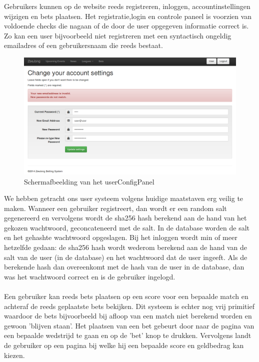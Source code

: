 \documentclass[11pt]{article}
\begin{document}
Gebruikers kunnen op de website reeds registreren, inloggen, accountinstellingen wijzigen en bets plaatsen.
Het registratie,login en controle paneel is voorzien van voldoende checks die nagaan of de door de user opgegeven informatie correct is.  Zo kan een user bijvoorbeeld niet registreren met een syntactisch ongeldig emailadres of een gebruikersnaam die reeds bestaat.
\begin{figure}[h!]
	\begin{center}
	\includegraphics[scale=0.35]{changesettings.png}

	\caption{Schermafbeelding van het userConfigPanel}
	\label{fig:configPanel}
	\end{center}
\end{figure}
We hebben getracht ons user systeem volgens huidige maatstaven erg veilig te maken.
Wanneer een gebruiker registreert, dan wordt er een random salt gegenereerd en vervolgens wordt de sha256 hash berekend aan de hand van het gekozen wachtwoord, geconcateneerd met de salt.
In de database worden de salt en het gehashte wachtwoord opgeslagen.
Bij het inloggen wordt min of meer hetzelfde gedaan: de sha256 hash wordt wederom berekend aan de hand van de salt van de user (in de database) en het wachtwoord dat de user ingeeft.
Als de berekende hash dan overeenkomt met de hash van de user in de database, dan was het wachtwoord correct en is de gebruiker ingelogd.
\\\\
Een gebruiker kan reeds bets plaatsen op een score voor een bepaalde match en achteraf de reeds geplaatste bets bekijken.  Dit systeem is echter nog vrij primitief waardoor de bets bijvoorbeeld bij afloop van een match niet berekend worden en gewoon 'blijven staan'.
Het plaatsen van een bet gebeurt door naar de pagina van een bepaalde wedstrijd te gaan en op de 'bet' knop te drukken.  Vervolgens landt de gebruiker op een pagina bij welke hij een bepaalde score en geldbedrag kan kiezen.
\end{document}
